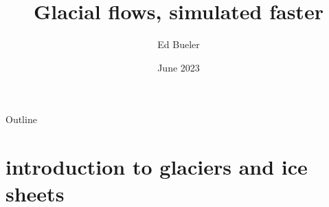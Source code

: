 \documentclass[svgnames,
               hyperref={colorlinks,citecolor=DeepPink4,linkcolor=FireBrick,urlcolor=Maroon},
               usepdftitle=false]  %
               {beamer}
\title{Glacial flows, simulated faster}
\author{Ed Bueler}
\institute[UAF]{University of Alaska Fairbanks}
\date[]{June 2023}
\begin{document}
\beamertemplatenavigationsymbolsempty

{
  \begin{frame}
    \titlepage
  \end{frame}
}

\begin{frame}{Outline}
  \tableofcontents[hideallsubsections]
\end{frame}


\section{introduction to glaciers and ice sheets}
\end{document}
